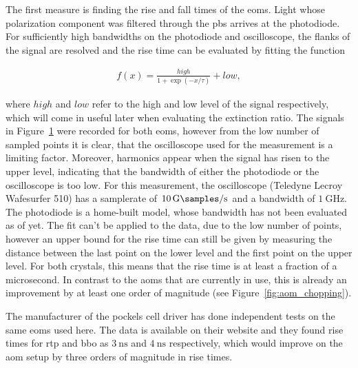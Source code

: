 The first measure is finding the rise and fall times of the \acp{eom}. Light whose polarization component was filtered through the \ac{pbs} arrives at the photodiode. For sufficiently high bandwidths on the photodiode and oscilloscope, the flanks of the signal are resolved and the rise time can be evaluated by fitting the function

\begin{align}
	f(x) = \frac{high}{1 + \exp{(-x/\tau)}} + low,
\end{align}

where $high$ and $low$ refer to the high and low level of the signal respectively, which will come in useful later when evaluating the extinction ratio. The signals in Figure~\ref{fig:eom_rise} were recorded for both \acp{eom}, however from the low number of sampled points it is clear, that the oscilloscope used for the measurement is a limiting factor. Moreover, harmonics appear when the signal has risen to the upper level, indicating that the bandwidth of either the photodiode or the oscilloscope is too low. For this measurement, the oscilloscope (Teledyne Lecroy Wafesurfer 510) has a samplerate of $\SI{10}{\giga\samples\per\second}$ and a bandwidth of $\SI{1}{\giga\hertz}$. The photodiode is a home-built model, whose bandwidth has not been evaluated as of yet. The fit can't be applied to the data, due to the low number of points, however an upper bound for the rise time can still be given by measuring the distance between the last point on the lower level and the first point on the upper level. For both crystals, this means that the rise time is at least a fraction of a microsecond. In contrast to the \acp{aom} that are currently in use, this is already an improvement by at least one order of magnitude (see Figure~\ref{fig:aom_chopping}).

The manufacturer of the pockels cell driver has done independent tests on the same \acp{eom} used here. The data is available on their website \cite{Bergmann2020} and they found rise times for \ac{rtp} and \ac{bbo} as $\SI{3}{\nano\second}$ and $\SI{4}{\nano\second}$ respectively, which would improve on the \ac{aom} setup by three orders of magnitude in rise times.
\begin{figure}[t]
	\label{fig:eom_rise}
\end{figure}

